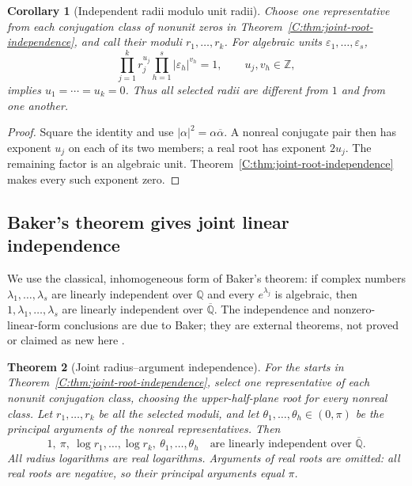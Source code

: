 \documentclass[11pt,a4paper]{article}
\newtheorem{theorem}{Theorem}[section]
\newtheorem{corollary}[theorem]{Corollary}
\theoremstyle{definition}
\theoremstyle{remark}
\numberwithin{equation}{section}
\begin{document}
\begin{corollary}[Independent radii modulo unit radii]
\label{C:cor:joint-radius-independence}
Choose one representative from each conjugation class of
nonunit zeros in Theorem~\ref{C:thm:joint-root-independence}, and call
their moduli $r_1,\ldots,r_k$.
For algebraic units $\varepsilon_1,\ldots,\varepsilon_s$,
\[
 \prod_{j=1}^k r_j^{u_j}
 \prod_{h=1}^s|\varepsilon_h|^{v_h}=1,
 \qquad u_j,v_h\in\mathbb Z,
\]
implies $u_1=\cdots=u_k=0$.
Thus all selected radii are different from $1$ and from one another.
\end{corollary}

\begin{proof}
Square the identity and use $|\alpha|^2=\alpha\overline\alpha$.
A nonreal conjugate pair then has exponent $u_j$ on each of its
two members; a real root has exponent $2u_j$.
The remaining factor is an algebraic unit.
Theorem~\ref{C:thm:joint-root-independence} makes every such exponent
zero.
\end{proof}

\subsection{Baker's theorem gives joint linear independence}

We use the classical, inhomogeneous form of Baker's theorem:
if complex numbers $\lambda_1,\ldots,\lambda_s$ are linearly
independent over $\mathbb Q$ and every $e^{\lambda_j}$ is algebraic,
then $1,\lambda_1,\ldots,\lambda_s$ are linearly independent over
$\overline{\mathbb Q}$.
The independence and nonzero-linear-form conclusions are due to
Baker; they are external theorems, not proved or claimed as new
here \cite{R092,R093}.

\begin{theorem}[Joint radius--argument independence]
\label{C:thm:joint-log-angle}
For the starts in Theorem~\ref{C:thm:joint-root-independence}, select
one representative of each nonunit conjugation class, choosing the
upper-half-plane root for every nonreal class.
Let $r_1,\ldots,r_k$ be all the selected moduli, and let
$\theta_1,\ldots,\theta_h\in(0,\pi)$ be the principal arguments of
the nonreal representatives.
Then
\[
 \boxed{\quad
 1,\ \pi,\ \log r_1,\ldots,\log r_k,\
 \theta_1,\ldots,\theta_h
 \quad\text{are linearly independent over }\overline{\mathbb Q}.
 \quad}
\]
All radius logarithms are real logarithms.
Arguments of real roots are omitted: all real roots are negative,
so their principal arguments equal $\pi$.
\end{theorem}
\end{document}
